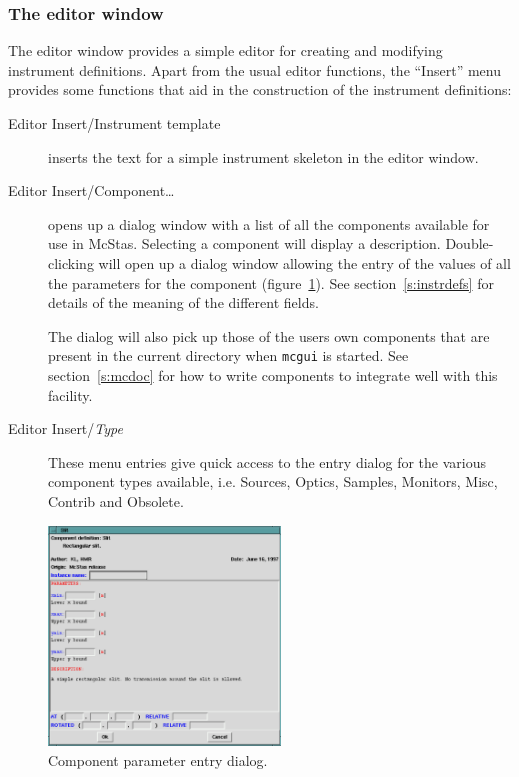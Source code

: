 \subsubsection{The editor window}

The editor window provides a simple editor for creating and modifying instrument
definitions. Apart from the usual editor functions, the ``Insert'' menu provides
some functions that aid in the construction of the instrument definitions:
\begin{description}
\item[Editor Insert/Instrument template] inserts the text for a simple instrument
  skeleton in the editor window.
\item[Editor Insert/Component\ldots] opens up a dialog window with a list of all
  the components available for use in McStas. Selecting a component will
  display a description. Double-clicking will open up a dialog window
  allowing the entry of the values of all the parameters for the
  component (figure~\ref{f:comp_dialog}). See section~\ref{s:instrdefs}
  for details of the meaning of the different fields.

  The dialog will also pick up those of the users own components that are
  present in the current directory when \verb+mcgui+ is started. See
  section~\ref{s:mcdoc} for how to write components to integrate well with this
  facility.
\item[Editor Insert/\textit{Type}] These menu entries give quick access to the
  entry dialog for the various component types available, i.e. Sources, Optics,
  Samples, Monitors, Misc, Contrib and Obsolete.
\end{description}
\begin{figure}[tbp]
  \begin{center}
    \includegraphics[width=0.55\textwidth]{figures/comp_dialog.eps}
    \caption{Component parameter entry dialog.}
    \label{f:comp_dialog}
  \end{center}
\end{figure}


